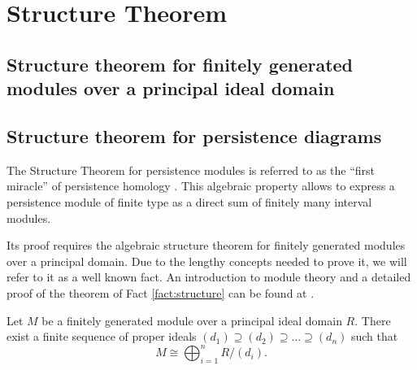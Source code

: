 \begin{definition}
     
\end{definition}

\begin{definition} \label{delta-matching}
    
\end{definition}

\begin{definition}
    
\end{definition}

\newpage
\chapter{Structure Theorem}
\section{Structure theorem for finitely generated modules over a principal ideal domain}
\section{Structure theorem for persistence diagrams}
The Structure Theorem for persistence modules is referred to as the ``first miracle'' of persistence homology \cite{nanda}. This algebraic property allows to express a persistence module of finite type as a direct sum of finitely many interval modules.

Its proof requires the algebraic structure theorem for finitely generated modules over a principal domain. Due to the lengthy concepts needed to prove it, we will refer to it as a well known fact. An introduction to module theory and a detailed proof of the theorem of Fact \ref{fact:structure} can be found at \cite[Chapter IV]{hungerford}.

\begin{fact} \cite[Chapter IV, Theorem 6.12]{hungerford} \label{fact:structure}
    Let $ M $ be a  finitely generated module over a principal ideal domain $R$. There exist a finite sequence of proper ideals $ (d_1) \supseteq (d_2) \supseteq \dots \supseteq (d_n) $ such that
    $$
        M \cong \bigoplus_{i=1}^n R / (d_i).
    $$
\end{fact}

